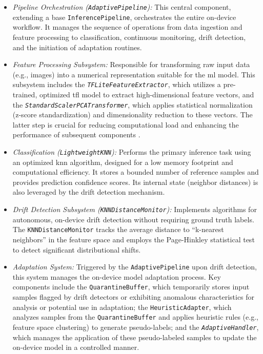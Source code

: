 \begin{itemize}
    \item \textit{Pipeline Orchestration (\texttt{AdaptivePipeline}):} This central component, extending a base \texttt{InferencePipeline}, orchestrates the entire on-device workflow. It manages the sequence of operations from data ingestion and feature processing to classification, continuous monitoring, drift detection, and the initiation of adaptation routines.
    \item \textit{Feature Processing Subsystem:} Responsible for transforming raw input data (e.g., images) into a numerical representation suitable for the \gls{ml} model. This subsystem includes the \textit{\texttt{TFLiteFeatureExtractor}}, which utilizes a pre-trained, optimized \gls{tfl} model to extract high-dimensional feature vectors, and the \textit{\texttt{StandardScalerPCATransformer}}, which applies statistical normalization (z-score standardization) and dimensionality reduction to these vectors. The latter step is crucial for reducing computational load and enhancing the performance of subsequent components \cite{disabatoTinyMachineLearning2024}.
    \item \textit{Classification (\texttt{LightweightKNN}):} Performs the primary inference task using an optimized \gls{knn} algorithm, designed for a low memory footprint and computational efficiency. It stores a bounded number of reference samples and provides prediction confidence scores. Its internal state (neighbor distances) is also leveraged by the drift detection mechanism.
    \item \textit{Drift Detection Subsystem (\texttt{KNNDistanceMonitor}):} Implements algorithms for autonomous, on-device drift detection without requiring ground truth labels. The \texttt{KNNDistanceMonitor} tracks the average distance to ``k-nearest neighbors'' in the feature space and employs the Page-Hinkley statistical test to detect significant distributional shifts.
    \item \textit{Adaptation System:} Triggered by the \texttt{AdaptivePipeline} upon drift detection, this system manages the on-device model adaptation process. Key components include the \texttt{QuarantineBuffer}, which temporarily stores input samples flagged by drift detectors or exhibiting anomalous characteristics for analysis or potential use in adaptation; the \texttt{HeuristicAdapter}, which analyzes samples from the \texttt{QuarantineBuffer} and applies heuristic rules (e.g., feature space clustering) to generate pseudo-labels; and the \textit{\texttt{AdaptiveHandler}}, which manages the application of these pseudo-labeled samples to update the on-device model in a controlled manner.

\end{itemize}
